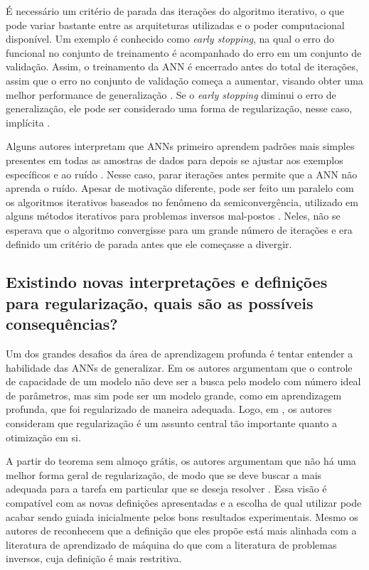 É necessário um critério de parada das iterações do algoritmo iterativo, o que pode variar bastante entre as arquiteturas utilizadas e o poder computacional disponível. Um exemplo é conhecido como \textit{early stopping}, na qual o erro do funcional no conjunto de treinamento é acompanhado do erro em um conjunto de validação. Assim, o treinamento da ANN é encerrado antes do total de iterações, assim que o erro no conjunto de validação começa a aumentar, visando obter uma melhor performance de generalização \cite[págs. 343-4]{Bishop1995book}.  Se o \textit{early stopping} diminui o erro de generalização, ele pode ser considerado uma forma de regularização, nesse caso, implícita \cite[pág. 2829]{Chen2002}. 

Alguns autores interpretam que ANNs primeiro aprendem padrões mais simples presentes em todas as amostras de dados para depois se ajustar aos exemplos específicos e ao ruído \cite{Krueger2017DeepND, 2017kukacka}. Nesse caso, parar iterações antes permite que a ANN não aprenda o ruído. Apesar de motivação diferente, pode ser feito um paralelo com os algoritmos iterativos baseados no fenômeno da semiconvergência, utilizado em alguns métodos iterativos para problemas inversos mal-postos \cite[pág. 110]{hansen2010discrete}. Neles, não se esperava que o algoritmo convergisse para um grande número de iterações e era definido um critério de parada antes que ele começasse a divergir. 

\subsection{Existindo novas interpretações e definições para regularização, quais são as possíveis consequências?}

Um dos grandes desafios da área de aprendizagem profunda é tentar entender a habilidade das ANNs de generalizar. Em \cite[pág. 229]{goodfellow2016deep} os autores argumentam que o controle de capacidade de um modelo não deve ser a busca pelo modelo com número ideal de parâmetros, mas sim pode ser um modelo grande, como em aprendizagem profunda, que foi regularizado de maneira adequada. Logo, em \cite[pág. 120]{goodfellow2016deep}, os autores consideram que regularização é um assunto central tão importante quanto a otimização em si.
 
A partir do teorema sem almoço grátis, os autores argumentam que não há uma melhor forma geral de regularização, de modo que se deve buscar a mais adequada para a tarefa em particular que se deseja resolver \cite[pág. 120]{goodfellow2016deep}. Essa visão é compatível com as novas definições apresentadas e a escolha de qual utilizar pode acabar sendo guiada inicialmente pelos bons resultados experimentais. Mesmo os autores de \cite{2017kukacka} reconhecem que a definição que eles propõe está mais alinhada com a literatura de aprendizado de máquina do que com a literatura de problemas inversos, cuja definição é mais restritiva. 

